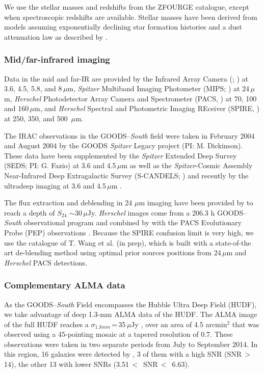\documentclass[longauth]{aa}
\begin{document}
We use the stellar masses and redshifts from the ZFOURGE catalogue, except when spectroscopic redshifts are available. Stellar masses have been derived from \cite{Bruzual2003} models \citep{Straatman2016} assuming exponentially declining star formation histories and a dust attenuation law as described by \cite{Calzetti2000}.

\subsubsection{Mid/far-infrared imaging}

Data in the mid and far-IR are provided by the Infrared Array Camera (; \citealt{Fazio2004}) at 3.6, 4.5, 5.8, and 8\,$\mu$m, \textit{Spitzer} Multiband Imaging Photometer (MIPS; \citealt{Rieke2004}) at 24\,$\mu$m, \textit{Herschel} Photodetector Array Camera and Spectrometer (PACS, \citealt{Poglitsch2010}) at 70, 100 and 160\,$\mu$m, and \textit{Herschel} Spectral and Photometric Imaging REceiver (SPIRE, \citealt{Griffin2010}) at 250, 350, and 500 \,$\mu$m.

The IRAC observations in the GOODS--\textit{South} field were taken in February 2004 and August 2004 by the GOODS \textit{Spitzer} Legacy project (PI: M. Dickinson). These data have been supplemented by the \textit{Spitzer} Extended Deep Survey (SEDS;  PI: G. Fazio) at 3.6 and 4.5\,$\mu$m \citep{Ashby2013} as well as the \textit{Spitzer}-Cosmic Assembly Near-Infrared Deep Extragalactic Survey (S-CANDELS; \citealt{Ashby2015}) and recently by the ultradeep  imaging  at 3.6 and 4.5\,$\mu$m \citep{Labbe2015}.

The flux extraction and deblending in 24 $\mu$m imaging have been provided by \cite{Magnelli2009} to reach a depth of $S_{24}$ $\sim$30\,$\mu$Jy.
\textit{Herschel} images come from a 206.3 h GOODS--\textit{South} observational program \citep{Elbaz2011} and combined by \cite{Magnelli2013} with the PACS Evolutionary Probe (PEP) observations \citep{Lutz2011}. Because the SPIRE confusion limit is very high, we use the catalogue of T. Wang et al. (in prep), which is built with a state-of-the art de-blending method using optimal prior sources positions from 24\,$\mu$m and \textit{Herschel} PACS detections.

\subsubsection{Complementary ALMA data}
As the GOODS--\textit{South} Field encompasses the Hubble Ultra Deep Field (HUDF), we take advantage of deep 1.3-mm ALMA data of the HUDF. The ALMA image of the full HUDF reaches a $\sigma_{1.3mm}$\,=\,35\,$\mu$Jy \citep{Dunlop2017}, over an area of 4.5 arcmin$^2$ that was observed using a 45-pointing mosaic at a tapered resolution of 0.7\arcsec. These observations were taken in two separate periods from July to September 2014. In this region, 16 galaxies were detected by \cite{Dunlop2017}, 3 of them with a high SNR (SNR\,$>$\, 14), the other 13 with lower SNRs (3.51\,$<$\, SNR\,$<$\, 6.63).
\end{document}
